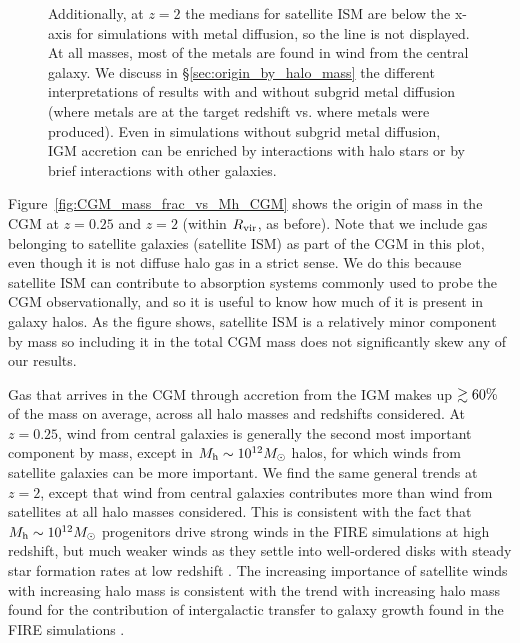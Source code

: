 \documentclass[fleqn,usenatbib]{mnras}
\begin{document}
\begin{figure}
{Additionally, at $z=2$ the medians for satellite ISM are below the x-axis for simulations with metal diffusion, so the line is not displayed.
At all masses, most of the metals are found in wind from the central galaxy. 
We discuss in \S \ref{sec:origin_by_halo_mass} the different interpretations of results with and without subgrid metal diffusion (where metals are at the target redshift vs. where metals were produced). 
Even in simulations without subgrid metal diffusion, IGM accretion can be enriched by interactions with halo stars or by brief interactions with other galaxies.}
\label{fig:CGM_metal_mass_frac_vs_Mh_CGM}
\end{figure}

Figure~\ref{fig:CGM_mass_frac_vs_Mh_CGM} shows the origin of mass in the CGM at $z=0.25$ and $z=2$ (within $R_{\rm vir}$, as before). 
Note that we include gas belonging to satellite galaxies (satellite ISM) as part of the CGM in this plot, even though it is not diffuse halo gas in a strict sense. 
We do this because satellite ISM can contribute to absorption systems commonly used to probe the CGM observationally, and so it is useful to know how much of it is present in galaxy halos. 
As the figure shows, satellite ISM is a relatively minor component by mass so including it in the total CGM mass does not significantly skew any of our results. 

Gas that arrives in the CGM through accretion from the IGM makes up $\gtrsim 60\%$ of the mass on average, across all halo masses and redshifts considered.
At $z=0.25$, wind from central galaxies is generally the second most important component by mass, except in $M_{\rm h}\sim 10^{12} M_{\odot}$ halos, for which winds from satellite galaxies can be more important. 
We find the same general trends at $z=2$, except that wind from central galaxies contributes more than wind from satellites at all halo masses considered. 
This is consistent with the fact that $M_{\rm h}\sim 10^{12} M_{\odot}$  progenitors drive strong winds in the FIRE simulations at high redshift, but much weaker winds as they settle into well-ordered disks with steady star formation rates at low redshift \citep[e.g.][]{Muratov2015}. 
The increasing importance of satellite winds with increasing halo mass is consistent with the trend with increasing halo mass found for the contribution of intergalactic transfer to galaxy growth found in the FIRE simulations \citep[][]{Angles-Alcazar2017}.
\end{document}
